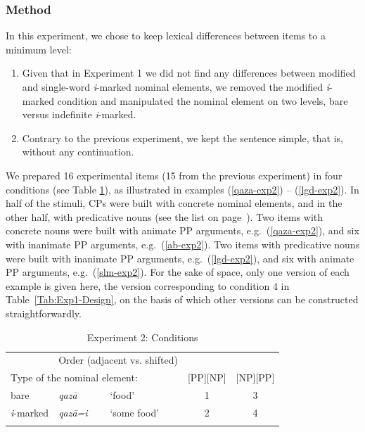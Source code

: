 \documentclass[output=paper]{langsci/langscibook}
\begin{document}
\subsubsection{Method}
In this experiment, we chose to keep lexical differences between items to a minimum level:
\begin{enumerate}
	\item Given that in Experiment 1 we did not find any differences between modified and single-word \textit{i}-marked nominal elements, we removed the modified \textit{i}-marked condition and manipulated the nominal element on two levels, bare versus indefinite \textit{i}-marked.
	
	\item Contrary to the previous experiment, we kept the sentence simple, that is, without any continuation. 
\end{enumerate}

We prepared 16 experimental items (15 from the previous experiment) in four conditions (see Table \ref{Tab:Exp2-Design}), as illustrated in examples (\ref{qaza-exp2}) -- (\ref{lgd-exp2}). 
In half of the stimuli, CPs were built with concrete nominal elements, and in the other half, with predicative nouns (see the list on page~\pageref{ListCP}). 
Two items with concrete nouns were built with animate PP arguments, e.g.~(\ref{qaza-exp2}), and six with inanimate PP arguments, e.g.~(\ref{ab-exp2}). 
Two items with predicative nouns were built with inanimate PP arguments, e.g.~(\ref{lgd-exp2}), and six with animate PP arguments, e.g.~(\ref{slm-exp2}).   For the sake of space, only one version of each example is given here, the version corresponding to condition 4 in Table~\ref{Tab:Exp1-Design}, on the basis of which other versions can be constructed straightforwardly.

\begin{table}
	\begin{tabular}{lllcc}
              \lsptoprule 
		\multicolumn{3}{l}{} & \multicolumn{2}{c}{Order (adjacent vs. shifted)}\\\cmidrule(lr){4-5} 
		\multicolumn{3}{l}{Type of the nominal element:} & [PP][NP] & [NP][PP]\\ 
		\midrule 
		bare & \textit{qaz\=a} & `food' & 1 & 3\\ 
		\textit{i}-marked &  \textit{qaz\=a=i} & `some food' & 2 & 4\\ 
		\lspbottomrule
	\end{tabular}
	\caption{Experiment 2: Conditions}\label{Tab:Exp2-Design}
\end{table}
\end{document}
